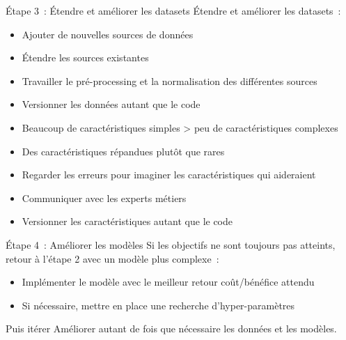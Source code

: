 \begin{frame}{Étape 3~: Étendre et améliorer les datasets}
  Étendre et améliorer les datasets~:

  \begin{itemize}[<+->]
    \item Ajouter de nouvelles sources de données
    \item Étendre les sources existantes
    \item Travailler le pré-processing et la normalisation des différentes sources
    \item Versionner les données autant que le code
  \end{itemize}


  \begin{itemize}[<+->]
    \item Beaucoup de caractéristiques simples > peu de caractéristiques complexes
    \item Des caractéristiques répandues plutôt que rares
    \item Regarder les erreurs pour imaginer les caractéristiques qui aideraient
    \item Communiquer avec les experts métiers
    \item Versionner les caractéristiques autant que le code
  \end{itemize}

\end{frame}

\begin{frame}{Étape 4~: Améliorer les modèles}
  Si les objectifs ne sont toujours pas atteints, retour à l'étape 2 avec un modèle plus complexe~:

  \begin{itemize}[<+->]
    \item Implémenter le modèle avec le meilleur retour coût/bénéfice attendu
    \item Si nécessaire, mettre en place une recherche d'hyper-paramètres
  \end{itemize}
\end{frame}

\begin{frame}{Puis itérer}
  Améliorer autant de fois que nécessaire les données et les modèles.
\end{frame}

